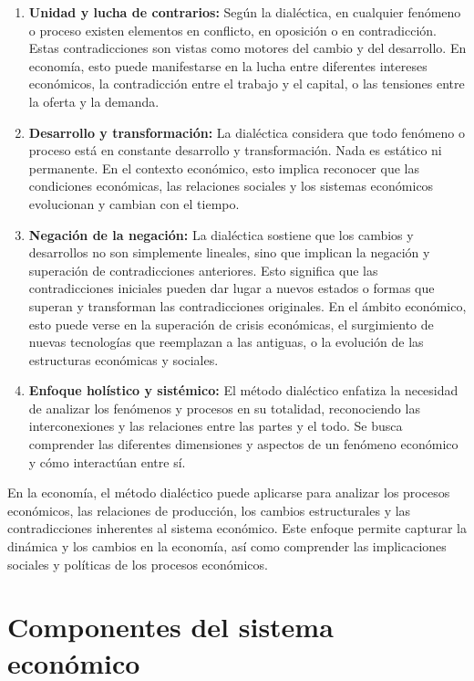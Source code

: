 \documentclass[
  jou,
  floatsintext,
  longtable,
  a4paper,
  nolmodern,
  notxfonts,
  notimes,
  12pt,
  colorlinks=true,linkcolor=blue,citecolor=blue,urlcolor=blue]{apa7}
\begin{document}
\begin{enumerate}
\def\labelenumi{\arabic{enumi}.}
\item
  \textbf{Unidad y lucha de contrarios:} Según la dialéctica, en
  cualquier fenómeno o proceso existen elementos en conflicto, en
  oposición o en contradicción. Estas contradicciones son vistas como
  motores del cambio y del desarrollo. En economía, esto puede
  manifestarse en la lucha entre diferentes intereses económicos, la
  contradicción entre el trabajo y el capital, o las tensiones entre la
  oferta y la demanda.
\item
  \textbf{Desarrollo y transformación:} La dialéctica considera que todo
  fenómeno o proceso está en constante desarrollo y transformación. Nada
  es estático ni permanente. En el contexto económico, esto implica
  reconocer que las condiciones económicas, las relaciones sociales y
  los sistemas económicos evolucionan y cambian con el tiempo.
\item
  \textbf{Negación de la negación:} La dialéctica sostiene que los
  cambios y desarrollos no son simplemente lineales, sino que implican
  la negación y superación de contradicciones anteriores. Esto significa
  que las contradicciones iniciales pueden dar lugar a nuevos estados o
  formas que superan y transforman las contradicciones originales. En el
  ámbito económico, esto puede verse en la superación de crisis
  económicas, el surgimiento de nuevas tecnologías que reemplazan a las
  antiguas, o la evolución de las estructuras económicas y sociales.
\item
  \textbf{Enfoque holístico y sistémico:} El método dialéctico enfatiza
  la necesidad de analizar los fenómenos y procesos en su totalidad,
  reconociendo las interconexiones y las relaciones entre las partes y
  el todo. Se busca comprender las diferentes dimensiones y aspectos de
  un fenómeno económico y cómo interactúan entre sí.
\end{enumerate}

En la economía, el método dialéctico puede aplicarse para analizar los
procesos económicos, las relaciones de producción, los cambios
estructurales y las contradicciones inherentes al sistema económico.
Este enfoque permite capturar la dinámica y los cambios en la economía,
así como comprender las implicaciones sociales y políticas de los
procesos económicos.

\section{Componentes del sistema
económico}\label{componentes-del-sistema-econuxf3mico}
\end{document}
